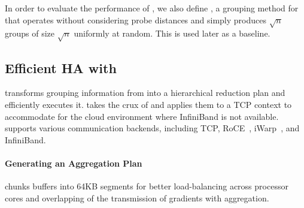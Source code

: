 
In order to evaluate the performance of \marcopolo, we also define \strongrandom, a grouping method for \mlha that operates without considering probe distances and simply produces $\sqrt{n}$ groups of size $\sqrt{n}$ uniformly at random. This is used later as a baseline.

\subsection{Efficient HA with \ha}
\label{sec:haimpl}
\ha transforms grouping information from \marcopolo into a hierarchical reduction plan and efficiently executes it. \ha takes the crux of \phub and applies them to a TCP context to accommodate for the cloud environment where InfiniBand is not available.
\ha supports various communication backends, including TCP, RoCE~\cite{softroce}, iWarp~\cite{softiwarp}, and InfiniBand.


\paragraph{Generating an Aggregation Plan}
\label{sec:generatingAggregationPlan}
\ha chunks buffers into 64KB segments for better load-balancing across processor cores and overlapping of the transmission of gradients with aggregation. %


